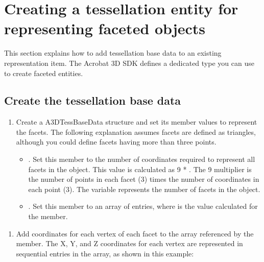 \documentclass[letterpaper,12pt,english,openany,oneside]{sphinxmanual}
\begin{document}
\section{Creating a tessellation entity for representing faceted objects}
\label{\detokenize{Plugins_A3D_API:creating-a-tessellation-entity-for-representing-faceted-objects}}
This section explains how to add tessellation base data to an existing representation item. The Acrobat 3D SDK defines a dedicated type you can use to create faceted entities.


\subsection{Create the tessellation base data}
\label{\detokenize{Plugins_A3D_API:create-the-tessellation-base-data}}\begin{enumerate}
%
\item {} 
Create a A3DTessBaseData structure and set its member values to represent the facets. The following explanation assumes facets are defined as triangles, although you could define facets having more than three points.
\begin{itemize}
\item {} 
. Set this member to the number of coordinates required to represent all facets in the object. This value is calculated as 9 * . The 9 multiplier is the number of points in each facet (3) times the number of coordinates in each point (3). The  variable represents the number of facets in the object.

\item {} 
. Set this member to an array of   entries, where  is the value calculated for the  member.

\end{itemize}

\end{enumerate}
\begin{enumerate}
%
\setcounter{enumi}{1}
\item {} 
Add coordinates for each vertex of each facet to the array referenced by the  member. The X, Y, and Z coordinates for each vertex are represented in sequential entries in the array, as shown in this example:

\end{enumerate}
\end{document}

